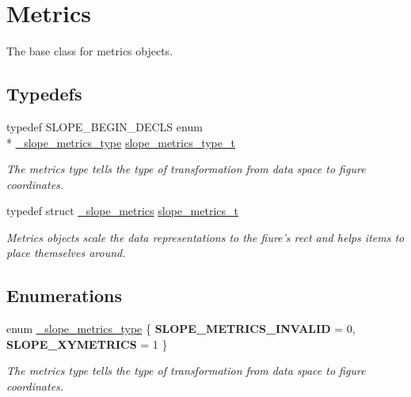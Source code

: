 \hypertarget{group__Metrics}{\section{Metrics}
\label{group__Metrics}
}


The base class for metrics objects.  


\subsection*{Typedefs}
\begin{DoxyCompactItemize}
\item 
typedef S\+L\+O\+P\+E\+\_\+\+B\+E\+G\+I\+N\+\_\+\+D\+E\+C\+L\+S enum \\*
\hyperlink{group__Metrics_gafd1cecb864b09319525ee096fc692dd4}{\+\_\+slope\+\_\+metrics\+\_\+type} \hyperlink{group__Metrics_ga5f51fc24807a4b3d2b0d41f354bbcedf}{slope\+\_\+metrics\+\_\+type\+\_\+t}
\begin{DoxyCompactList}\small\item\em The metrics type tells the type of transformation from data space to figure coordinates. \end{DoxyCompactList}\item 
\hypertarget{group__Metrics_gab80787ee8ae8dc449e770249fe0e3c35}{typedef struct \hyperlink{struct__slope__metrics}{\+\_\+slope\+\_\+metrics} \hyperlink{group__Metrics_gab80787ee8ae8dc449e770249fe0e3c35}{slope\+\_\+metrics\+\_\+t}}\label{group__Metrics_gab80787ee8ae8dc449e770249fe0e3c35}

\begin{DoxyCompactList}\small\item\em Metrics objects scale the data representations to the fiure's rect and helps items to place themselves around. \end{DoxyCompactList}\end{DoxyCompactItemize}
\subsection*{Enumerations}
\begin{DoxyCompactItemize}
\item 
enum \hyperlink{group__Metrics_gafd1cecb864b09319525ee096fc692dd4}{\+\_\+slope\+\_\+metrics\+\_\+type} \{ {\bfseries S\+L\+O\+P\+E\+\_\+\+M\+E\+T\+R\+I\+C\+S\+\_\+\+I\+N\+V\+A\+L\+I\+D} = 0, 
{\bfseries S\+L\+O\+P\+E\+\_\+\+X\+Y\+M\+E\+T\+R\+I\+C\+S} = 1
 \}
\begin{DoxyCompactList}\small\item\em The metrics type tells the type of transformation from data space to figure coordinates. \end{DoxyCompactList}\end{DoxyCompactItemize}
